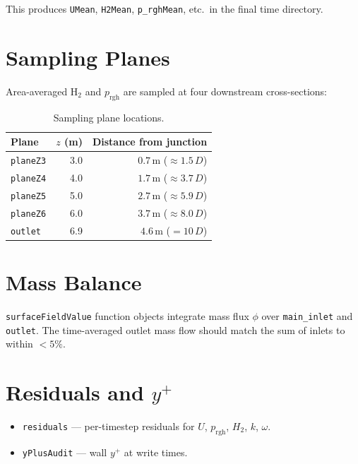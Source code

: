 \documentclass[12pt,a4paper]{report}
\begin{document}
This produces \texttt{UMean}, \texttt{H2Mean}, \texttt{p\_rghMean},
etc.\ in the final time directory.

\section{Sampling Planes}

Area-averaged H$_2$ and $p_{\mathrm{rgh}}$ are sampled at four
downstream cross-sections:

\begin{table}[H]
\centering
\caption{Sampling plane locations.}
\begin{tabular}{@{}lrr@{}}
\toprule
\textbf{Plane} & $z$ (m) & Distance from junction \\
\midrule
\texttt{planeZ3} & 3.0 & $0.7$\,m ($\approx 1.5\,D$) \\
\texttt{planeZ4} & 4.0 & $1.7$\,m ($\approx 3.7\,D$) \\
\texttt{planeZ5} & 5.0 & $2.7$\,m ($\approx 5.9\,D$) \\
\texttt{planeZ6} & 6.0 & $3.7$\,m ($\approx 8.0\,D$) \\
\texttt{outlet}  & 6.9 & $4.6$\,m ($= 10\,D$) \\
\bottomrule
\end{tabular}
\end{table}

\section{Mass Balance}

\texttt{surfaceFieldValue} function objects integrate mass flux
$\phi$ over \texttt{main\_inlet} and \texttt{outlet}.  The
time-averaged outlet mass flow should match the sum of inlets to
within $< 5\%$.

\section{Residuals and $y^+$}

\begin{itemize}
  \item \texttt{residuals} --- per-timestep residuals for
        $U$, $p_{\mathrm{rgh}}$, $H_2$, $k$, $\omega$.
  \item \texttt{yPlusAudit} --- wall $y^+$ at write times.
\end{itemize}


\end{document}
